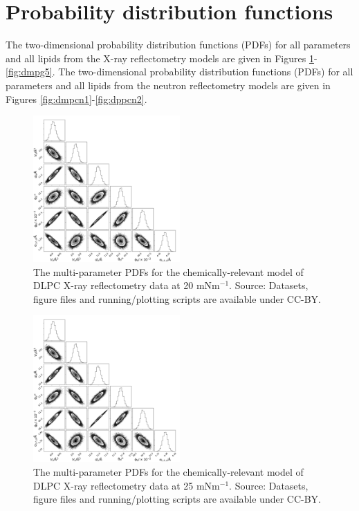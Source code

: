 \documentclass[11pt,a4paper]{paper}
\begin{document}
\section{Probability distribution functions}

The two-dimensional probability distribution functions (PDFs) for all parameters and all lipids from the X-ray reflectometry models are given in Figures \ref{fig:dlpc2}-\ref{fig:dmpg5}. The two-dimensional probability distribution functions (PDFs) for all parameters and all lipids from the neutron reflectometry models are given in Figures \ref{fig:dmpcn1}-\ref{fig:dppcn2}.
\begin{figure}[h]
	\centering
	\includegraphics[width=0.50\textwidth]{figures/dlpc1_all_corner}
	\caption{The multi-parameter PDFs for the chemically-relevant model of DLPC X-ray reflectometry data at 20 mNm$^{-1}$. Source: Datasets, figure files and running/plotting scripts are available under CC-BY.\cite{mccluskey_2018}}
	\label{fig:dlpc2}
\end{figure}
\begin{figure}[h]
	\centering
	\includegraphics[width=0.50\textwidth]{figures/dlpc2_all_corner}
	\caption{The multi-parameter PDFs for the chemically-relevant model of DLPC X-ray reflectometry data at 25 mNm$^{-1}$. Source: Datasets, figure files and running/plotting scripts are available under CC-BY.\cite{mccluskey_2018}}
	\label{fig:dlpc3}
\end{figure}
\end{document}
